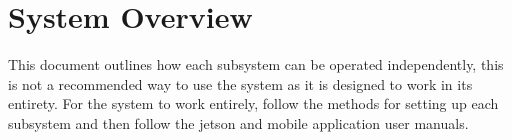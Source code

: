 \chapter{System Overview}

This document outlines how each subsystem can be operated independently, 
this is not a recommended way to use the system as it is designed to work in its entirety.
\newline
\newline
For the system to work entirely, follow the methods for setting up each subsystem and 
then follow the jetson and mobile application user manuals.